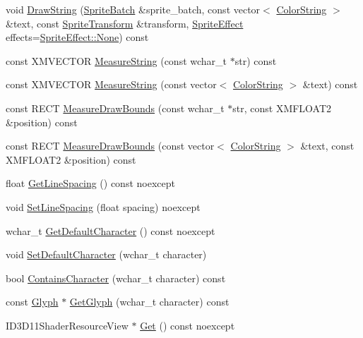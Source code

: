 \begin{DoxyCompactItemize}
\item 
void \hyperlink{classmage_1_1_sprite_font_a10fee860b9ccbc3063c1721deb7688e5}{Draw\+String} (\hyperlink{classmage_1_1_sprite_batch}{Sprite\+Batch} \&sprite\+\_\+batch, const vector$<$ \hyperlink{structmage_1_1_color_string}{Color\+String} $>$ \&text, const \hyperlink{structmage_1_1_sprite_transform}{Sprite\+Transform} \&transform, \hyperlink{namespacemage_a9cfe18123066ba4236f548f9de75d881}{Sprite\+Effect} effects=\hyperlink{namespacemage_a5e7e18b0154373ce8fc942fe3f6b27fda6adf97f83acf6453d4a6a4b1070f3754}{Sprite\+Effect\+::\+None}) const
\item 
const X\+M\+V\+E\+C\+T\+OR \hyperlink{classmage_1_1_sprite_font_af8d3b1e3f9cbda7d3f1c5ab95100dae7}{Measure\+String} (const wchar\+\_\+t $\ast$str) const
\item 
const X\+M\+V\+E\+C\+T\+OR \hyperlink{classmage_1_1_sprite_font_a17416e00488252cfda8778265a6f2be9}{Measure\+String} (const vector$<$ \hyperlink{structmage_1_1_color_string}{Color\+String} $>$ \&text) const
\item 
const R\+E\+CT \hyperlink{classmage_1_1_sprite_font_a80e5f0cdbb424754a0fb8239103d0f26}{Measure\+Draw\+Bounds} (const wchar\+\_\+t $\ast$str, const X\+M\+F\+L\+O\+A\+T2 \&position) const
\item 
const R\+E\+CT \hyperlink{classmage_1_1_sprite_font_a7204248284cf5f158c16794f6c6fa253}{Measure\+Draw\+Bounds} (const vector$<$ \hyperlink{structmage_1_1_color_string}{Color\+String} $>$ \&text, const X\+M\+F\+L\+O\+A\+T2 \&position) const
\item 
float \hyperlink{classmage_1_1_sprite_font_a281f33047c7627053a5bf61f8fa704fe}{Get\+Line\+Spacing} () const noexcept
\item 
void \hyperlink{classmage_1_1_sprite_font_adeaa2852ec0c8ce3817f0f69663f0a35}{Set\+Line\+Spacing} (float spacing) noexcept
\item 
wchar\+\_\+t \hyperlink{classmage_1_1_sprite_font_a9be513809e714558708cab21a22d7316}{Get\+Default\+Character} () const noexcept
\item 
void \hyperlink{classmage_1_1_sprite_font_a0b0feb25673d6f9d9e3215167800d817}{Set\+Default\+Character} (wchar\+\_\+t character)
\item 
bool \hyperlink{classmage_1_1_sprite_font_a01836c4197661dbdd66c624d8dc6a7c3}{Contains\+Character} (wchar\+\_\+t character) const
\item 
const \hyperlink{structmage_1_1_glyph}{Glyph} $\ast$ \hyperlink{classmage_1_1_sprite_font_aa13424a1e0153ffb9433bb2cb416360b}{Get\+Glyph} (wchar\+\_\+t character) const
\item 
I\+D3\+D11\+Shader\+Resource\+View $\ast$ \hyperlink{classmage_1_1_sprite_font_a8e43f8d97fb7e5ee03ed49fb45ee1b5f}{Get} () const noexcept
\end{DoxyCompactItemize}

